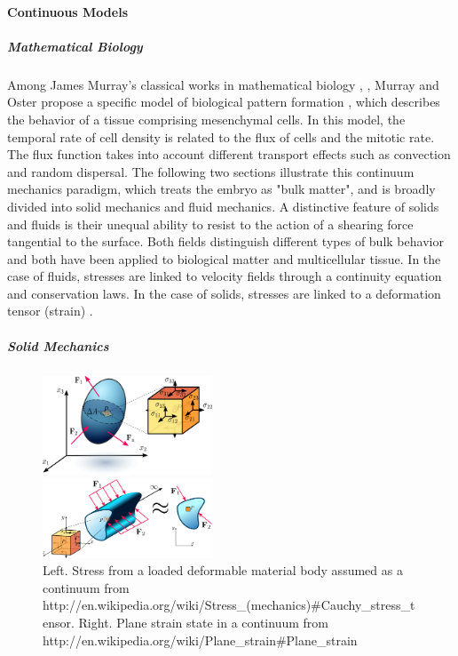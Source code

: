 

\paragraph{Continuous Models}


\subparagraph{Mathematical Biology}


Among James Murray's classical works in mathematical biology \cite{Murray:2001uq}, \cite{Murray:2003ty}, Murray and Oster propose a specific model of biological pattern formation \cite{Murray:1984tp}, which describes the behavior of a tissue comprising mesenchymal cells. In this model, the temporal rate of cell density is related to the flux of cells and the mitotic rate. The flux function takes into account different transport effects such as convection and random dispersal. The following two sections illustrate this continuum mechanics paradigm,  which treats the embryo as "bulk matter", and is broadly divided into solid mechanics and fluid mechanics. A distinctive feature of solids and fluids is their unequal ability to resist to the action of a shearing force tangential to the surface. Both fields distinguish different types of bulk behavior and both have been applied to biological matter and multicellular tissue. In the case of fluids, stresses are linked to velocity fields through a continuity equation and conservation laws. In the case of solids, stresses are linked to a deformation tensor (strain) \cite{Fleury:2005ul}.

\subparagraph{Solid Mechanics}

\begin{figure}
\begin{center}
\includegraphics[width=0.45\textwidth]{../../images/biomechanics_sota/solids/1000px-Stress_in_a_continuum.png}
\end{center}
\begin{center}
\includegraphics[width=0.45\textwidth]{../../images/biomechanics_sota/solids/1000px-Plane_strain.png}
\end{center}
\caption{Left. Stress from a loaded deformable material body assumed as a continuum from http://en.wikipedia.org/wiki/Stress_(mechanics)#Cauchy_stress_tensor. Right. Plane strain state in a continuum from http://en.wikipedia.org/wiki/Plane_strain#Plane_strain  }
\label{solids_1000px-Stress_in_a_continuum.png}
\end{figure}

